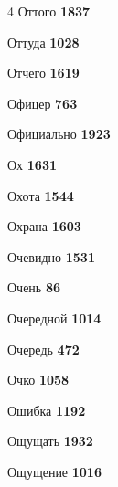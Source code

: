 \begin{multicols}{4}
\noindent Оттого \dotfill \textbf{\color{secondary} 1837}\par
\noindent Оттуда \dotfill \textbf{\color{secondary} 1028}\par
\noindent Отчего \dotfill \textbf{\color{secondary} 1619}\par
\noindent Офицер \dotfill \textbf{\color{secondary} 763}\par
\noindent Официально \dotfill \textbf{\color{secondary} 1923}\par
\noindent Ох \dotfill \textbf{\color{secondary} 1631}\par
\noindent Охота \dotfill \textbf{\color{secondary} 1544}\par
\noindent Охрана \dotfill \textbf{\color{secondary} 1603}\par
\noindent Очевидно \dotfill \textbf{\color{secondary} 1531}\par
\noindent Очень \dotfill \textbf{\color{secondary} 86}\par
\noindent Очередной \dotfill \textbf{\color{secondary} 1014}\par
\noindent Очередь \dotfill \textbf{\color{secondary} 472}\par
\noindent Очко \dotfill \textbf{\color{secondary} 1058}\par
\noindent Ошибка \dotfill \textbf{\color{secondary} 1192}\par
\noindent Ощущать \dotfill \textbf{\color{secondary} 1932}\par
\noindent Ощущение \dotfill \textbf{\color{secondary} 1016}\par


\end{multicols}
